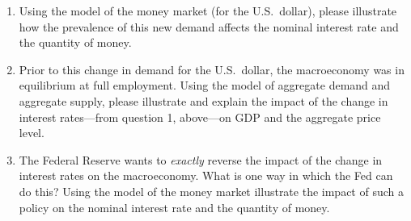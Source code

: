 \documentclass[
    letterpaper,paper=portrait,fleqn,
    DIV=16,fontsize=12pt,twoside=semi,
    parskip=full-,
    headings=standardclasses]
{scrartcl}
\begin{document}
\begin{enumerate}

\item Using the model of the money market (for the U.S.~dollar), please illustrate how the prevalence of this new demand affects the nominal interest rate and the quantity of money.

\vspace{2.0\baselineskip}

\begin{center}
\end{center}

\vspace{1.0\baselineskip}

\item Prior to this change in demand for the U.S.~dollar, the macroeconomy was in equilibrium at full employment. Using the model of aggregate demand and aggregate supply, please illustrate and explain the impact of the change in interest rates---from question 1, above---on GDP and the aggregate price level.

\vfill

\begin{center}
\end{center}

\vspace{1.0\baselineskip}

\item The Federal Reserve wants to \emph{exactly} reverse the impact of the change in interest rates on the macroeconomy.  What is one way in which the Fed can do this? Using the model of the money market illustrate the impact of such a policy on the nominal interest rate and the quantity of money.

\vfill

\begin{center}
\end{center}

\end{enumerate}
\end{document}
